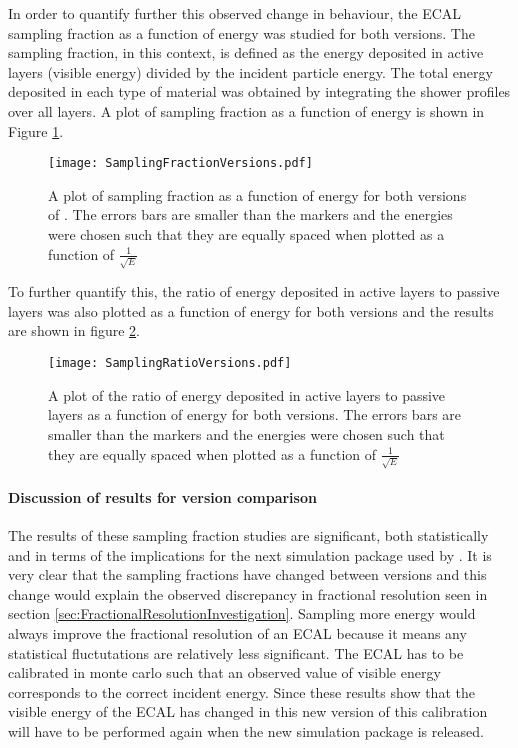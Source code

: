 In order to quantify further this observed change in behaviour, the ECAL sampling fraction as a function of energy was studied for both \geant versions.  The sampling fraction, in this context, is defined as the energy deposited in active layers (visible energy) divided by the incident particle energy.  The total energy deposited in each type of material was obtained by integrating the shower profiles over all layers.  A plot of sampling fraction as a function of energy is shown in Figure \ref{fig:sfcomp}.
\begin{figure}[h]
  \centering
  \texttt{[image: SamplingFractionVersions.pdf]}
  \caption{A plot of sampling fraction as a function of energy for both versions of \geant.  The errors bars are smaller than the markers and the energies were chosen such that they are equally spaced when plotted as a function of $\frac{1}{\sqrt{E}}$}
  \label{fig:sfcomp}
\end{figure}
To further quantify this, the ratio of energy deposited in active layers to passive layers was also plotted as a function of energy for both \geant versions and the results are shown in figure \ref{fig:ratiocomp}.
\begin{figure}[h]
  \centering
  \texttt{[image: SamplingRatioVersions.pdf]}
  \caption{A plot of the ratio of energy deposited in active layers to passive layers as a function of energy for both \geant versions.  The errors bars are smaller than the markers and the energies were chosen such that they are equally spaced when plotted as a function of $\frac{1}{\sqrt{E}}$}
  \label{fig:ratiocomp}
\end{figure}

\paragraph{Discussion of results for \geant version comparison}
\label{sec:Discussionofresultsone}
The results of these sampling fraction studies are significant, both statistically and in terms of the implications for the next simulation package used by \lhcb.  It is very clear that the sampling fractions have changed between \geant versions and this change would explain the observed discrepancy in fractional resolution seen in section \ref{sec:FractionalResolutionInvestigation}.  Sampling more energy would always improve the fractional resolution of an ECAL because it means any statistical fluctutations are relatively less significant. The ECAL has to be calibrated in monte carlo such that an observed value of visible energy corresponds to the correct incident energy.  Since these results show that the visible energy of the ECAL has changed in this new version of \geant this calibration will have to be performed again when the new simulation package is released.

